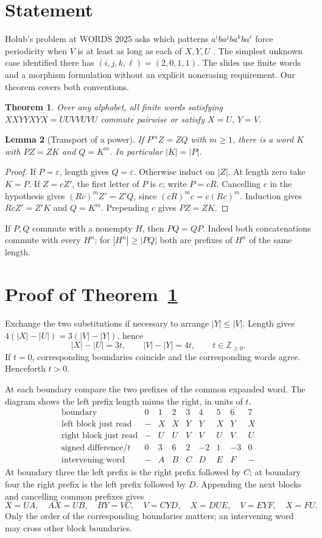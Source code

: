 \documentclass[11pt]{article}
\newtheorem{theorem}{Theorem}
\newtheorem{lemma}[theorem]{Lemma}
\newcommand{\eps}{\varepsilon}
\theoremstyle{remark}\newtheorem*{remark}{Remark}
\begin{document}
\section{Statement}
Holub's problem at WORDS 2025 asks which patterns \(a^i b a^j b a^k b a^\ell\) force periodicity when \(V\) is at least as long as each of \(X,Y,U\) \cite[pp.~3--5]{words}. The simplest unknown case identified there has \((i,j,k,\ell)=(2,0,1,1)\). The slides use finite words and a morphism formulation without an explicit nonerasing requirement. Our theorem covers both conventions.
\begin{theorem}\label{main}
Over any alphabet, all finite words satisfying \(XXYYXYX=UUVVUVU\) commute pairwise or satisfy \(X=U,\ Y=V\).
\end{theorem}
\begin{lemma}[Transport of a power]\label{transport}
If \(P^m Z=Z Q\) with \(m\ge1\), there is a word \(K\) with \(PZ=ZK\) and \(Q=K^m\). In particular \(|K|=|P|\).
\end{lemma}
\begin{proof}
If \(P=\eps\), length gives \(Q=\eps\). Otherwise induct on \(|Z|\). At length zero take \(K=P\). If \(Z=cZ'\), the first letter of \(P\) is \(c\); write \(P=cR\). Cancelling \(c\) in the hypothesis gives \((Rc)^m Z'=Z'Q\), since \((cR)^m c=c(Rc)^m\). Induction gives \(RcZ'=Z'K\) and \(Q=K^m\). Prepending \(c\) gives \(PZ=ZK\).
\end{proof}
If \(P,Q\) commute with a nonempty \(H\), then \(PQ=QP\). Indeed both concatenations commute with every \(H^n\); for \(|H^n|\ge |PQ|\) both are prefixes of \(H^n\) of the same length.

\section{Proof of Theorem~\ref{main}}
Exchange the two substitutions if necessary to arrange \(|Y|\le |V|\). Length gives \(4(|X|-|U|)=3(|V|-|Y|)\), hence
\[
 |X|-|U|=3t,\qquad |V|-|Y|=4t,\qquad t\in\mathbb Z_{\ge0}.
\]
If \(t=0\), corresponding boundaries coincide and the corresponding words agree. Henceforth \(t>0\).

At each boundary compare the two prefixes of the common expanded word. The diagram shows the left prefix length minus the right, in units of \(t\).
\[
\begin{array}{c|rrrrrrrr}
\text{boundary}&0&1&2&3&4&5&6&7\\ \hline
\text{left block just read}&-&X&X&Y&Y&X&Y&X\\
\text{right block just read}&-&U&U&V&V&U&V&U\\
\text{signed difference}/t&0&3&6&2&-2&1&-3&0\\
\text{intervening word}&-&A&B&C&D&E&F&-
\end{array}
\]
At boundary three the left prefix is the right prefix followed by \(C\); at boundary four the right prefix is the left prefix followed by \(D\). Appending the next blocks and cancelling common prefixes gives
\[
 X=UA,\quad AX=UB,\quad BY=VC,\quad V=CYD,\quad
 X=DUE,\quad V=EYF,\quad X=FU .
\]
Only the order of the corresponding boundaries matters; an intervening word may cross other block boundaries.
\end{document}
